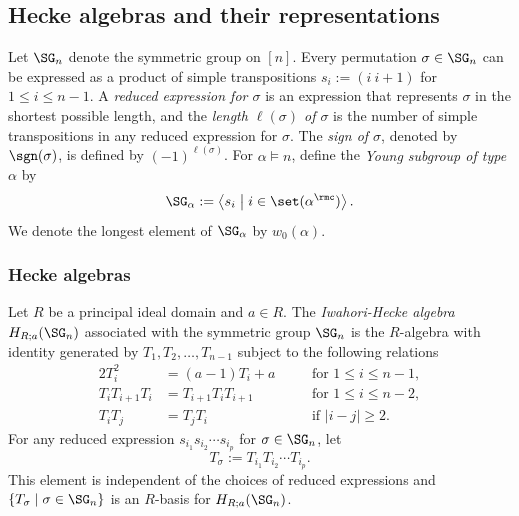 \documentclass[12pt, reqno]{amsart}
\theoremstyle{plain}
\theoremstyle{definition}
\numberwithin{equation}{section}
\numberwithin{figure}{section}
\numberwithin{table}{section}
\begin{document}
\subsection{Hecke algebras and their representations}

Let $\SG_n$ denote the symmetric group on $[n]$. Every permutation $\sigma \in \SG_n$ can be expressed as a product of simple transpositions $s_i := (i \ i+1)$ for $1 \leq i \leq n-1$.
A \emph{reduced expression for $\sigma$} is an expression that represents $\sigma$ in the shortest possible length, and 
the \emph{length $\ell(\sigma)$ of $\sigma$} is the number of simple transpositions in any reduced expression for $\sigma$.
The \emph{sign of $\sigma$}, denoted by $\sgn(\sigma)$, is defined by $(-1)^{\ell(\sigma)}$.
For $\alpha \models n$, define the \emph{Young subgroup of type $\alpha$} by
\[
\SG_\alpha := 
\left\langle s_i \; \middle| \; i \in \set(\alpha^\rmc) \right\rangle.
\]
We denote the longest element of $\SG_\alpha$ by $w_0(\alpha)$.






\subsubsection{Hecke algebras}\label{subsec: Hecke alg}
Let $R$ be a principal ideal domain and $a \in R$.
The \emph{Iwahori-Hecke algebra} $H_{R;a}(\SG_n)$ associated with the symmetric group $\SG_n$ is the $R$-algebra with identity generated by $T_1, T_2, \ldots, T_{n-1}$ subject to the following relations
\begin{alignat}{2}
\label{eq: def of Hecke alg}
T_i^2 &= (a-1)T_i + a
&\quad& \text{for $1\le i \le n-1$}, \nonumber \\ 
T_i T_{i+1} T_i &= T_{i+1} T_i T_{i+1}
&\quad& \text{for $1\le i \le n-2$}, \\ 
T_i T_j &= T_j T_i
&\quad& \text{if $|i-j| \ge 2$.}
\nonumber
\end{alignat}
For any reduced expression $s_{i_1} s_{i_2} \cdots s_{i_p}$ for $\sigma \in \SG_n$, let 
\[
T_{\sigma} := T_{i_1} T_{i_2} \cdots T_{i_p}.
\]
This element is independent of the choices of reduced expressions and $\{T_\sigma \mid \sigma \in \SG_n\}$ is an $R$-basis for $H_{R;a}(\SG_n)$.
\end{document}
